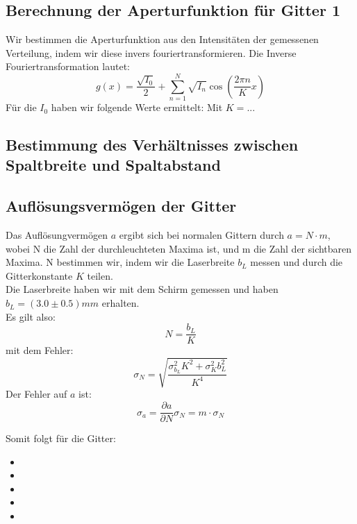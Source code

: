 \subsection{Berechnung der Aperturfunktion f\"ur Gitter 1}

Wir bestimmen die Aperturfunktion aus den Intensit\"aten der gemessenen Verteilung, indem wir diese invers fouriertransformieren. Die Inverse Fouriertransformation lautet:
$$g(x) = \frac{\sqrt{I_0}}{2} + \sum_{n=1}^N \sqrt{I_n}\cos\left(\frac{2\pi n}{K}x \right)$$
F\"ur die $I_0$ haben wir folgende Werte ermittelt:
Mit $K = ... $ %

\subsection{Bestimmung des Verh\"altnisses zwischen Spaltbreite und Spaltabstand}

\subsection{Aufl\"osungsverm\"ogen der Gitter}

Das Aufl\"osungverm\"ogen $a$ ergibt sich bei normalen Gittern durch $a=N\cdot m$, wobei N die Zahl der durchleuchteten Maxima ist, und m die Zahl der sichtbaren Maxima. N bestimmen wir, indem wir die Laserbreite $b_L$ messen und durch die Gitterkonstante $K$ teilen.\\
Die Laserbreite haben wir mit dem Schirm gemessen und haben $b_L = (3.0 \pm 0.5) mm$ erhalten.\\
Es gilt also: $$N = \frac{b_L}{K}$$
mit dem Fehler: $$\sigma_N = \sqrt{\frac{\sigma_{b_L}^2K^2 + \sigma_K^2b_L^2}{K^4}}$$
Der Fehler auf $a$ ist: $$\sigma_a = \frac{\partial a}{\partial N}\sigma_N = m\cdot \sigma_N$$

Somit folgt f\"ur die Gitter:

\begin{itemize}
\item
\item
\item
\item
\item
\end{itemize}





























